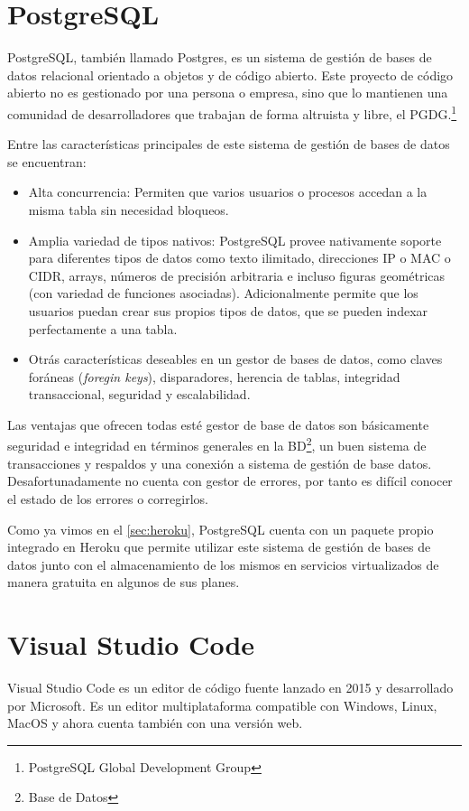 \documentclass[a4paper, 12pt]{book}
\begin{document}
\section{PostgreSQL}
\label{sec:postgeSQL}
PostgreSQL, también llamado Postgres, es un sistema de gestión de bases de datos relacional orientado a objetos y de código abierto. Este proyecto de código abierto no es gestionado por una persona o empresa, sino que lo mantienen una comunidad de desarrolladores que trabajan de forma altruista y libre, el PGDG.\footnote{PostgreSQL Global Development Group}

Entre las características principales de este sistema de gestión de bases de datos se encuentran: 
\begin{itemize}
	\item Alta concurrencia: Permiten que varios usuarios o procesos accedan a la misma tabla sin necesidad bloqueos. 
	\item Amplia variedad de tipos nativos: PostgreSQL provee nativamente soporte para diferentes tipos de datos como texto ilimitado, direcciones IP o MAC o CIDR, arrays, números de precisión arbitraria e incluso figuras geométricas (con variedad de funciones asociadas). Adicionalmente permite que los usuarios puedan crear sus propios tipos de datos, que se pueden indexar perfectamente a una tabla. 
	\item Otrás características deseables en un gestor de bases de datos, como claves foráneas (\emph{foregin keys}), disparadores, herencia de tablas, integridad transaccional, seguridad y escalabilidad.  
\end{itemize}
Las ventajas que ofrecen todas esté gestor de base de datos son básicamente seguridad e integridad en términos generales en la BD\footnote{Base de Datos}, un buen sistema de transacciones y respaldos y una conexión a sistema de gestión de base datos. Desafortunadamente no cuenta con gestor de errores, por tanto es difícil conocer el estado de los errores o corregirlos. 

Como ya vimos en el \ref{sec:heroku}, PostgreSQL cuenta con un paquete propio integrado en Heroku que permite utilizar este sistema de gestión de bases de datos junto con el almacenamiento de los mismos en servicios virtualizados de manera gratuita en algunos de sus planes.  

\section{Visual Studio Code}
Visual Studio Code es un editor de código fuente lanzado en 2015 y desarrollado por Microsoft. Es un editor multiplataforma compatible con Windows, Linux, MacOS y ahora cuenta también con una versión web. 
\end{document}
